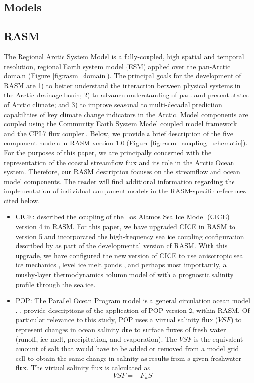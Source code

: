 \documentclass[jgrga, draft]{agutex}
\begin{document}
\begin{article}
\section{Models}
\label{sec:models}

\subsection{RASM}
\label{sec:rasm}
The Regional Arctic System Model is a fully-coupled, high spatial and temporal resolution, regional Earth system model (ESM) applied over the pan-Arctic domain (Figure \ref{fig:rasm_domain}).
The principal goals for the development of RASM are 1) to better understand the interaction between physical systems in the Arctic drainage basin; 2) to advance understanding of past and present states of Arctic climate; and 3) to improve seasonal to multi-decadal prediction capabilities of key climate change indicators in the Arctic.
Model components are coupled using the Community Earth System Model \citep[CESM; ][]{Hurrell_2013} coupled model framework and the CPL7 flux coupler \citep{Craig_2011}.
Below, we provide a brief description of the five component models in RASM version 1.0 (Figure \ref{fig:rasm_coupling_schematic}).
For the purposes of this paper, we are principally concerned with the representation of the coastal streamflow flux and its role in the Arctic Ocean system.
Therefore, our RASM description focuses on the streamflow and ocean model components.
The reader will find additional information regarding the implementation of individual component models in the RASM-specific references cited below.

\begin{itemize}[leftmargin=+.5in]
\item CICE: \citet{Roberts_2015a} described the coupling of the Los Alamos Sea Ice Model (CICE) version 4 in RASM.
For this paper, we have upgraded CICE in RASM to version 5 \citep{Hunke2015} and incorporated the high-frequency sea ice coupling configuration described by \citet{Roberts_2015a} as part of the developmental version of RASM.
With this upgrade, we have configured the new version of CICE to use anisotropic sea ice mechanics \citep{Tsamados2013}, level ice melt ponds \citep{Hunke2013}, and perhaps most importantly, a mushy-layer thermodynamics column model of \citet{Turner2015} with a prognostic salinity profile through the sea ice.
\item POP: The Parallel Ocean Program model is a general circulation ocean model \citep{Smith_2010}.
\citet{Maslowski_2012}, \citet{Roberts_2015a} provide descriptions of the application of POP version 2, within RASM.
Of particular relevance to this study, POP uses a virtual salinity flux ($VSF$) to represent changes in ocean salinity due to surface fluxes of fresh water (runoff, ice melt, precipitation, and evaporation).
The $VSF$ is the equivalent amount of salt that would have to be added or removed from a model grid cell to obtain the same change in salinity as results from a given freshwater flux.
The virtual salinity flux is calculated as
\begin{equation}
  \label{eq:SaltFlux}
  VSF=-F_w S
\end{equation}


\end{itemize}
\end{article}
\end{document}
